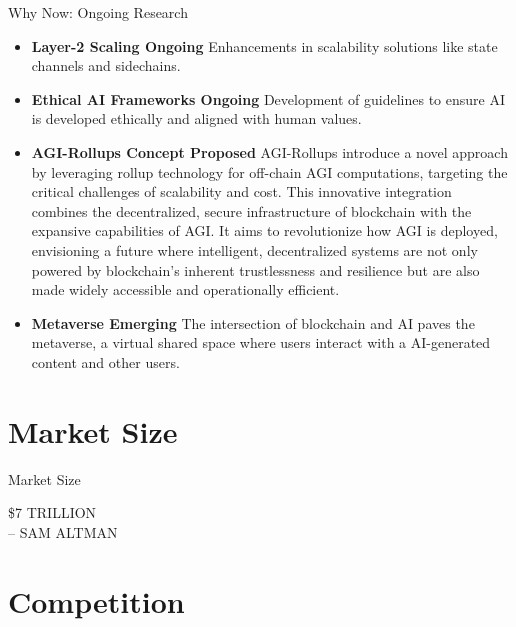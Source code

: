 \documentclass{beamer}
\begin{document}
\begin{frame}{Why Now: Ongoing Research}
\begin{itemize}
    \item \textbf{Layer-2 Scaling \textbar Ongoing \textbar} {\footnotesize Enhancements in scalability solutions like state channels and sidechains.}
    \item \textbf{Ethical AI Frameworks \textbar Ongoing \textbar} {\footnotesize Development of guidelines to ensure AI is developed ethically and aligned with human values.}
    \item \textbf{AGI-Rollups Concept \textbar Proposed \textbar} {\footnotesize AGI-Rollups introduce a novel approach by leveraging rollup technology for off-chain AGI computations, targeting the critical challenges of scalability and cost. This innovative integration combines the decentralized, secure infrastructure of blockchain with the expansive capabilities of AGI. It aims to revolutionize how AGI is deployed, envisioning a future where intelligent, decentralized systems are not only powered by blockchain's inherent trustlessness and resilience but are also made widely accessible and operationally efficient. }
    \item \textbf{Metaverse \textbar Emerging \textbar} {\footnotesize The  intersection of blockchain and AI paves the metaverse, a virtual shared space where users interact with a AI-generated content and other users. }
\end{itemize}
\end{frame}



\section{Market Size}
\begin{frame}{Market Size}
\begin{center}
    \Huge \$7 TRILLION \\
    \Large -- SAM ALTMAN
\end{center}
\end{frame}






\section{Competition}
\end{document}
